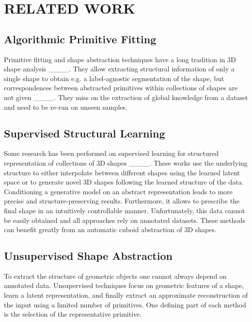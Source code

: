 \section{RELATED WORK}
\label{sec:related_work}


\subsection{Algorithmic Primitive Fitting}
Primitive fitting and shape abstraction techniques have a long tradition in 3D shape analysis ____.
They allow extracting structural information of only a single shape to obtain e.g. a label-agnostic segmentation of the shape, but correspondences between abstracted primitives within collections of shapes are not given ____.
They miss on the extraction of global knowledge from a dataset and need to be re-run on unseen samples.


\subsection{Supervised Structural Learning}
Some research has been performed on supervised learning for structured representation of collections of 3D shapes ____.
These works use the underlying structure to either interpolate between different shapes using the learned latent space or to generate novel 3D shapes following the learned structure of the data.
Conditioning a generative model on an abstract representation leads to more precise and structure-preserving results.
Furthermore, it allows to prescribe the final shape in an intuitively controllable manner.
Unfortunately, this data cannot be easily obtained and all approaches rely on annotated datasets.
These methods can benefit greatly from an automatic cuboid abstraction of 3D shapes.


\subsection{Unsupervised Shape Abstraction}
To extract the structure of geometric objects one cannot always depend on annotated data.
Unsupervised techniques focus on geometric features of a shape, learn a latent representation, and finally extract an approximate reconstruction of the input using a limited number of primitives.
One defining part of each method is the selection of the representative primitive.

